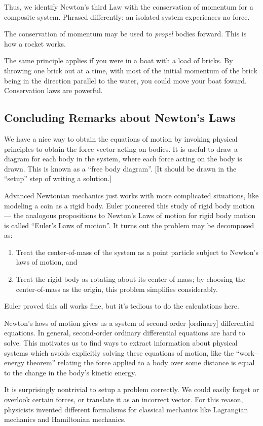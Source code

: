 Thus, we identify Newton's third Law with the conservation of momentum
for a composite system.
Phrased differently: an isolated system experiences no force.

\begin{remark}
The conservation of momentum may be used to \emph{propel} bodies
forward. This is how a rocket works.

The same principle applies if you were in a boat with a load of bricks.
By throwing one brick out at a time, with most of the initial momentum
of the brick being in the direction parallel to the water, you could
move your boat foward. Conservation laws are powerful.
\end{remark}

\subsection{Concluding Remarks about Newton's Laws}

We have a nice way to obtain the equations of motion by invoking
physical principles to obtain the force vector acting on bodies.
It is useful to draw a diagram for each body in the system, where each
force acting on the body is drawn. This is known as a ``free body
diagram''. [It should be drawn in the ``setup'' step of writing a solution.]

Advanced Newtonian mechanics just works with more complicated
situations, like modeling a coin as a rigid body. Euler pioneered this
study of rigid body motion --- the analogous propositions to Newton's
Laws of motion for rigid body motion is called ``Euler's Laws of motion''.
It turns out the problem may be decomposed as:
\begin{enumerate}[label=(\arabic*)]
\item Treat the center-of-mass of the system as a point particle subject
  to Newton's laws of motion, and
\item Treat the rigid body as rotating about its center of mass; by
  choosing the center-of-mass as the origin, this problem simplifies considerably.
\end{enumerate}
Euler proved this all works fine, but it's tedious to do the
calculations here.

Newton's laws of motion gives us a system of second-order [ordinary] differential
equations. In general, second-order ordinary differential equations are
hard to solve. This motivates us to find ways to extract information
about physical systems which avoids explicitly solving these equations
of motion, like the ``work--energy theorem'' relating the force applied
to a body over some distance is equal to the change in the body's
kinetic energy.

It is surprisingly nontrivial to setup a problem correctly. We could
easily forget or overlook certain forces, or translate it as an
incorrect vector. For this reason, physicists invented different
formalisms for classical mechanics like Lagrangian mechanics and
Hamiltonian mechanics.
